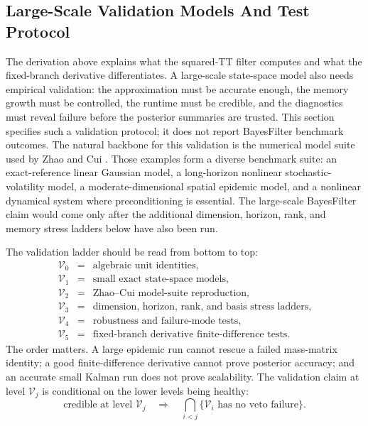 \documentclass[11pt]{article}
\numberwithin{equation}{section}
\begin{document}
\subsection{Large-Scale Validation Models And Test Protocol}

The derivation above explains what the squared-TT filter computes and what the
fixed-branch derivative differentiates.  A large-scale state-space model also
needs empirical validation: the approximation must be accurate enough, the
memory growth must be controlled, the runtime must be credible, and the
diagnostics must reveal failure before the posterior summaries are trusted.
This section specifies such a validation protocol; it does not report
BayesFilter benchmark outcomes.
The natural backbone for this validation is the numerical model suite used by
Zhao and Cui \cite{zhao2024ttsequential}.  Those examples form a diverse
benchmark suite: an exact-reference linear Gaussian model, a long-horizon
nonlinear stochastic-volatility model, a moderate-dimensional spatial epidemic
model, and a nonlinear dynamical system where preconditioning is essential.
The large-scale BayesFilter claim would come only after the additional
dimension, horizon, rank, and memory stress ladders below have also been run.

The validation ladder should be read from bottom to top:
\begin{equation}
\begin{array}{ccl}
\mathcal V_0&=&\text{algebraic unit identities},\\
\mathcal V_1&=&\text{small exact state-space models},\\
\mathcal V_2&=&\text{Zhao--Cui model-suite reproduction},\\
\mathcal V_3&=&\text{dimension, horizon, rank, and basis stress ladders},\\
\mathcal V_4&=&\text{robustness and failure-mode tests},\\
\mathcal V_5&=&\text{fixed-branch derivative finite-difference tests}.
\end{array}
\label{eq:p27-v1}
\end{equation}
The order matters.  A large epidemic run cannot rescue a failed mass-matrix
identity; a good finite-difference derivative cannot prove posterior accuracy;
and an accurate small Kalman run does not prove scalability.  The validation
claim at level \(\mathcal V_j\) is conditional on the lower levels being
healthy:
\begin{equation}
    \text{credible at level }\mathcal V_j
    \quad\Longrightarrow\quad
    \bigcap_{i<j}\{\mathcal V_i\text{ has no veto failure}\}.
    \label{eq:p27-v2}
\end{equation}
\end{document}
